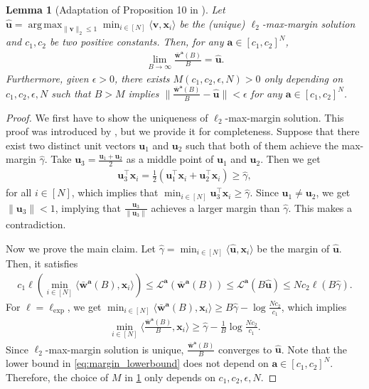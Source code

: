 \documentclass{article} %
\theoremstyle{plain}
\newtheorem{lemma}[theorem]{Lemma}
\theoremstyle{definition}
\theoremstyle{remark}
\newcommand{\Ls}{\mathcal{L}}
\DeclareMathOperator*{\argmax}{arg\,max}
\def\ba{{\boldsymbol a}}
\def\bu{{\mathbf u}}
\def\bx{{\mathbf x}}
\def\bw{{\mathbf w}}
\def\bv{{\mathbf v}}
\begin{document}
\begin{lemma}[Adaptation of Proposition 10 in \citet{ji2020regularization}] \label{lemma:reg_path}
    Let $\hat{\bu}=\argmax_{\|\bv\|_2 \leq 1} \min_{i \in [N]} \langle \bv, \bx_i\rangle$ be the (unique) $\ell_2$-max-margin solution and $c_1, c_2$ be two positive constants. Then, for any $\ba \in [c_1, c_2]^N$, 
    \begin{align*}
        \lim_{B \rightarrow \infty} \frac{\bar{\bw}^\ba(B)}{B} = \hat{\bu}.
    \end{align*}
    Furthermore, given $\epsilon >0$, there exists $M(c_1, c_2, \epsilon, N)>0$ only depending on $c_1, c_2, \epsilon, N$ such that $B > M$ implies $\|\frac{\bar{\bw}^\ba(B)}{B}-\hat{\bu}\| < \epsilon$ for any $\ba \in [c_1, c_2]^N$.
\end{lemma}
\begin{proof}
    We first have to show the uniqueness of $\ell_2$-max-margin solution. This proof was introduced by \citet[Proposition 10]{ji2020regularization}, but we provide it for completeness. Suppose that there exist two distinct unit vectors $\bu_1$ and $\bu_2$ such that both of them achieve the max-margin $\hat{\gamma}$. Take $\bu_3=\frac{\bu_1+\bu_2}{2}$ as a middle point of $\bu_1$ and $\bu_2$. Then we get 
    \begin{align*}
        \bu_3^\top \bx_i = \frac{1}{2}(\bu_1^\top \bx_i + \bu_2^\top \bx_i) \geq \hat{\gamma},
    \end{align*}
    for all $i \in [N]$, which implies that $\min_{i \in [N]}\bu_3^\top \bx_i \geq \hat{\gamma}.$ Since $\bu_1 \neq \bu_2$, we get $\|\bu_3\| < 1$, implying that $\frac{\bu_3}{\|\bu_3\|}$ achieves a larger margin than $\hat{\gamma}$. This makes a contradiction.
    
    Now we prove the main claim. Let $\hat{\gamma} = \min_{i \in [N]}\langle \hat{\bu}, \bx_i \rangle$ be the margin of $\hat{\bu}$. Then, it satisfies
    \begin{align} \label{eq:ineq_marginloss}
        c_1 \ell(\min_{i\in[N]}\langle \bar{\bw}^\ba(B), \bx_i \rangle) \leq \Ls^\ba(\bar{\bw}^\ba(B)) \leq \Ls^\ba(B\hat{\bu}) \leq Nc_2\ell(B\hat{\gamma}).
    \end{align}
    For $\ell=\ell_{\text{exp}}$, we get $\min_{i \in [N]} \langle \bar{\bw}^\ba(B), \bx_i \rangle \geq B \hat{\gamma} - \log \frac{Nc_2}{c_1}$, which implies
    \begin{align}\label{eq:margin_lowerbound}
        \min_{i \in [N]} \langle \frac{\bar{\bw}^\ba(B)}{B}, \bx_i \rangle \geq \hat{\gamma} - \frac{1}{B}\log \frac{Nc_2}{c_1}.
    \end{align}
    Since $\ell_2$-max-margin solution is unique, $\frac{\bar{\bw}^\ba(B)}{B}$ converges to $\hat{\bu}$. Note that the lower bound in \cref{eq:margin_lowerbound} does not depend on $\ba \in [c_1, c_2]^N$. Therefore, the choice of $M$ in \cref{lemma:reg_path} only depends on $c_1, c_2, \epsilon, N$.


\end{proof}
\end{document}
